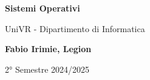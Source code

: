 \begin{titlepage}
	\begin{center}
		\vspace*{1cm}

		\Huge
		\textbf{Sistemi Operativi}

		\vspace{0.5cm}
		\LARGE
		UniVR - Dipartimento di Informatica

		\vspace{1.5cm}

		\textbf{Fabio Irimie, Legion}

		\vfill


		\vspace{0.8cm}


		2° Semestre 2024/2025

	\end{center}
\end{titlepage}
